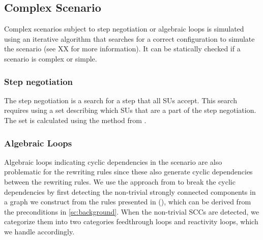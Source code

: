 \subsection{Complex Scenario}
Complex scenarios subject to step negotiation or algebraic loops is simulated using an iterative algorithm that searches for a correct configuration to simulate the scenario (see XX for more information).
It can be statically checked if a scenario is complex or simple.

\subsubsection{Step negotiation}
The step negotiation is a search for a step that all SUs accept.
This search requires using a set describing which SUs that are a part of the step negotiation.
The set is calculated using the method from \cite{thrane2021}.


\subsubsection{Algebraic Loops}
Algebraic loops indicating cyclic dependencies in the scenario are also problematic for the rewriting rules since these also generate cyclic dependencies between the rewriting rules. 
We use the approach from \cite{thrane2021} to break the cyclic dependencies by first detecting the non-trivial strongly connected components in a graph we construct from the rules presented in (), which can be derived from the preconditions in \cref{sc:background}.
When the non-trivial SCCs are detected, we categorize them into two categories feedthrough loops and reactivity loops, which we handle accordingly.

